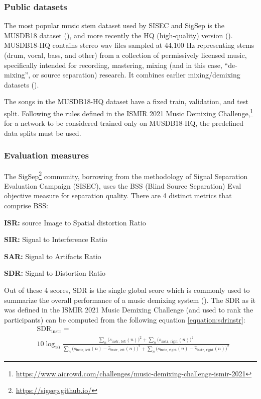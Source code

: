 \documentclass[report.tex]{subfiles}
\begin{document}
\subsubsection{Public datasets}

The most popular music stem dataset used by SISEC and SigSep is the MUSDB18 dataset (\cite{musdb18}), and more recently the HQ (high-quality) version (\cite{musdb18hq}). MUSDB18-HQ contains stereo wav files sampled at 44,100 Hz representing stems (drum, vocal, bass, and other) from a collection of permissively licensed music, specifically intended for recording, mastering, mixing (and in this case, ``de-mixing'', or source separation) research. It combines earlier mixing/demixing datasets (\cite{sisec2016, otherdataset2}).

The songs in the MUSDB18-HQ dataset have a fixed train, validation, and test split. Following the rules defined in the ISMIR 2021 Music Demixing Challenge,\footnote{\url{https://www.aicrowd.com/challenges/music-demixing-challenge-ismir-2021}} for a network to be considered trained only on MUSDB18-HQ, the predefined data splits must be used.

\subsubsection{Evaluation measures}
\label{sec:evalbss}

The SigSep\footnote{\url{https://sigsep.github.io/}} community, borrowing from the methodology of Signal Separation Evaluation Campaign (SISEC), uses the BSS (Blind Source Separation) Eval \cite{bss} objective measure for separation quality. There are 4 distinct metrics that comprise BSS:

\begin{tight_itemize}
\item
	\textbf{ISR:} source Image to Spatial distortion Ratio
\item
	\textbf{SIR:} Signal to Interference Ratio
\item
	\textbf{SAR:} Signal to Artifacts Ratio
\item
	\textbf{SDR:} Signal to Distortion Ratio
\end{tight_itemize}

Out of these 4 scores, SDR is the single global score which is commonly used to summarize the overall performance of a music demixing system (\cite{sdruseful}). The SDR as it was defined in the ISMIR 2021 Music Demixing Challenge (and used to rank the participants) can be computed from the following equation \eqref{equation:sdrinstr}:
\begin{align}
	\nonumber & \text{SDR}_{\text{instr}} = \\
	&10 \log_{10}\frac{\sum_{n}\big(s_{\text{instr, left}}(n)\big)^{2} + \sum_{n}\big(s_{\text{instr, right}}(n)\big)^{2}}{\sum_{n}\big(s_{\text{instr, left}}(n) - \hat{s}_{\text{instr, left}}(n)\big)^{2} + \sum_{n}\big(s_{\text{instr, right}}(n) - \hat{s}_{\text{instr, right}}(n)\big)^{2}} \tag{10}\label{equation:sdrinstr}
\end{align}
\end{document}
